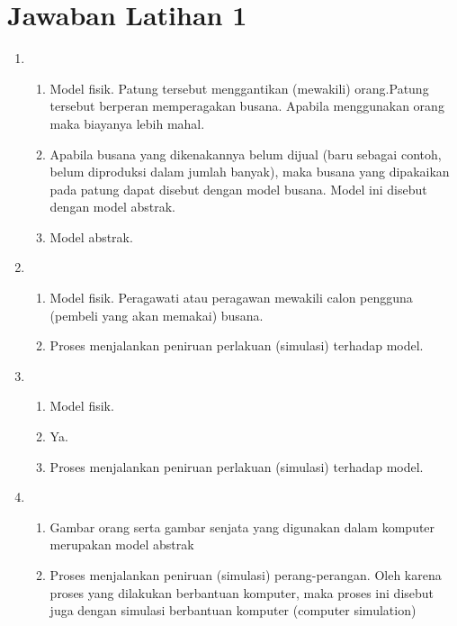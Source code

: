 \documentclass[10pt]{article}
\begin{document}
\section*{Jawaban Latihan 1}
\begin{enumerate}
    \item 
    \begin{enumerate}
        \item Model fisik. Patung tersebut menggantikan (mewakili) orang.Patung tersebut berperan memperagakan busana. Apabila
menggunakan orang maka biayanya lebih mahal.
\item Apabila busana yang dikenakannya belum dijual (baru sebagai
contoh, belum diproduksi dalam jumlah banyak), maka busana yang
dipakaikan pada patung dapat disebut dengan model busana. Model
ini disebut dengan model abstrak.
\item Model abstrak.
    \end{enumerate}
    \item 
\begin{enumerate}
    \item Model fisik.
Peragawati atau peragawan mewakili calon pengguna (pembeli
yang akan memakai) busana.
\item Proses menjalankan peniruan perlakuan (simulasi) terhadap model.
\end{enumerate}
\item  \begin{enumerate}
    \item  Model fisik.
\item Ya.
\item Proses menjalankan peniruan perlakuan (simulasi) terhadap model.
\end{enumerate}
\item \begin{enumerate}
    \item Gambar orang serta gambar senjata yang digunakan dalam
komputer merupakan model abstrak
\item Proses menjalankan peniruan (simulasi) perang-perangan. Oleh
karena proses yang dilakukan berbantuan komputer, maka proses
ini disebut juga dengan simulasi berbantuan komputer (computer
simulation)
\end{enumerate}
\end{enumerate}
\end{document}
